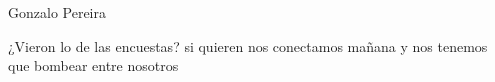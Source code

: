 \begin{IEEEbiography}{Gonzalo Pereira}

¿Vieron lo de  las encuestas?
si quieren nos conectamos mañana
y nos tenemos que bombear entre nosotros

\end{IEEEbiography}